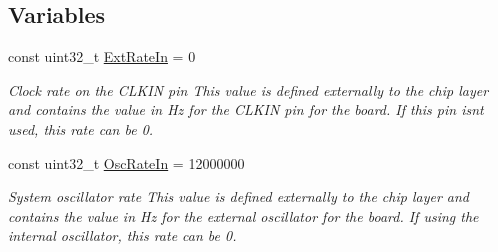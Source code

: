 \subsection*{Variables}
\begin{DoxyCompactItemize}
\item 
const uint32\+\_\+t \hyperlink{group__hal_ga74ceed751e84a920be263a7fe3da67f0}{Ext\+Rate\+In} = 0
\begin{DoxyCompactList}\small\item\em Clock rate on the C\+L\+K\+IN pin This value is defined externally to the chip layer and contains the value in Hz for the C\+L\+K\+IN pin for the board. If this pin isn\textquotesingle{}t used, this rate can be 0. \end{DoxyCompactList}\item 
const uint32\+\_\+t \hyperlink{group__hal_ga2e84f0502f9a7fdd271b97c588696e6f}{Osc\+Rate\+In} = 12000000
\begin{DoxyCompactList}\small\item\em System oscillator rate This value is defined externally to the chip layer and contains the value in Hz for the external oscillator for the board. If using the internal oscillator, this rate can be 0. \end{DoxyCompactList}\end{DoxyCompactItemize}
